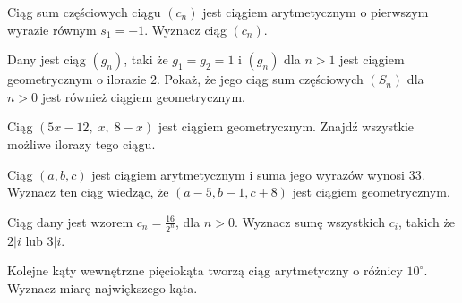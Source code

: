 \zadanie Ciąg sum częściowych ciągu $(c_n)$ jest ciągiem arytmetycznym o pierwszym wyrazie równym $s_1 = -1$. Wyznacz ciąg $(c_n)$.

\zadanie Dany jest ciąg $(g_n)$, taki że $g_1 = g_2 = 1$ i $(g_n)$ dla $n > 1$ jest ciągiem geometrycznym o ilorazie $2$. Pokaż, że jego ciąg sum częściowych $(S_n)$ dla $n > 0$ jest również ciągiem geometrycznym.

\zadanie Ciąg $(5x - 12,\;x,\;8 - x)$ jest ciągiem geometrycznym. Znajdź wszystkie możliwe ilorazy tego ciągu. %

\zadanie Ciąg $(a, b, c)$ jest ciągiem arytmetycznym i suma jego wyrazów wynosi $33$. Wyznacz ten ciąg wiedząc, że $(a - 5, b - 1, c + 8)$ jest ciągiem geometrycznym. 

\zadanie Ciąg dany jest wzorem $c_n = \frac{16}{2^n}$, dla $n > 0$. Wyznacz sumę wszystkich $c_i$, takich że $2|i$ lub $3|i$. %

\zadanie Kolejne kąty wewnętrzne pięciokąta tworzą ciąg arytmetyczny o różnicy $10^{\circ}$. Wyznacz miarę największego kąta. %